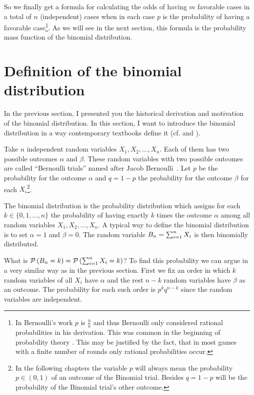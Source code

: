 So we finally get a formula for calculating the odds of having $m$ favorable cases in a total of $n$ (independent) cases when in each case $p$ is the probability of having a favorable case\footnote{In Bernoulli's work $p$ is $\tfrac ba$ and thus Bernoulli only considered rational probabilities in his derivation. This was common in the beginning of probability theory . This may be justified by the fact, that in most games with a finite number of rounds only rational probabilities occur.}. As we will see in the next section, this formula is the probability mass function of the binomial distribution.

\section{Definition of the binomial distribution}

In the previous section, I presented you the historical derivation and motivation of the binomial distribution. In this section, I want to introduce the binomial distribution in a way contemporary textbooks define it (cf. \cite[p. 33]{georgii} and \cite[pp. 57-58]{irle}).

Take $n$ independent random variables $X_1, X_2, \ldots, X_n$. Each of them has two possible outcomes $\alpha$ and $\beta$. These random variables with two possible outcomes are called ``Bernoulli trials'' named after Jacob Bernoulli~\cite[p. 45]{uspensky}\cite{wiki:bernoulli_distribution}. Let $p$ be the probability for the outcome $\alpha$ and $q=1-p$ the probability for the outcome $\beta$ for each $X_i$\footnote{In the following chapters the variable $p$ will always mean the probability $p\in(0,1)$ of an outcome of the Binomial trial. Besides $q=1-p$ will be the probability of the Binomial trial's other outcome.}.

The binomial distribution is the probability distribution which assigns for each $k\in \{0,1,\ldots,n\}$ the probability of having exactly $k$ times the outcome $\alpha$ among all random variables $X_1,X_2,\ldots,X_n$. A typical way to define the binomial distribution is to set $\alpha=1$ and $\beta=0$. The random variable $B_{n}=\sum_{i=1}^n X_i$ is then binomially distributed.

What is $\mathcal P\left({B_{n} = k}\right) = \mathcal P\left({\sum_{i=1}^n X_i=k}\right)$? To find this probability we can argue in a very similar way as in the previous section. First we fix an order in which $k$ random variables of all $X_i$ have $\alpha$ and the rest $n-k$ random variables have $\beta$ as an outcome. The probability for each such order is $p^kq^{n-k}$ since the random variables are independent.

